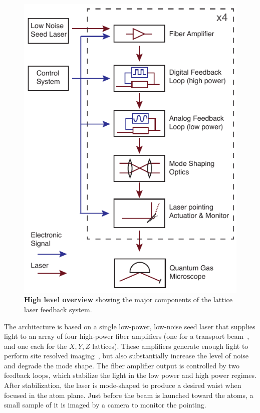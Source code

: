 \documentclass[twocolumn,aps,pra,showpacs,preprintnumbers,bibnotes]{revtex4-1}
\begin{document}
\begin{figure}
  \begin{center}
    \includegraphics{fig/figure1/figure1.pdf}
    \caption{\textbf{High level overview} showing the major components of the lattice laser feedback system.}
  \end{center}
\end{figure}

The architecture is based on a single low-power, low-noise seed laser that supplies light to an array of four high-power fiber amplifiers (one for a transport beam~\cite{Huber2014}, and one each for the $X,Y,Z$ lattices).
These amplifiers generate enough light to perform site resolved imaging~\cite{Parsons2016}, but also substantially increase the level of noise and degrade the mode shape. 
The fiber amplifier output is controlled by two feedback loops, which stabilize the light in the low power and high power regimes.
After stabilization, the laser is mode-shaped to produce a desired waist when focused in the atom plane. 
Just before the beam is launched toward the atoms, a small sample of it is imaged by a camera to monitor the pointing.
\end{document}
